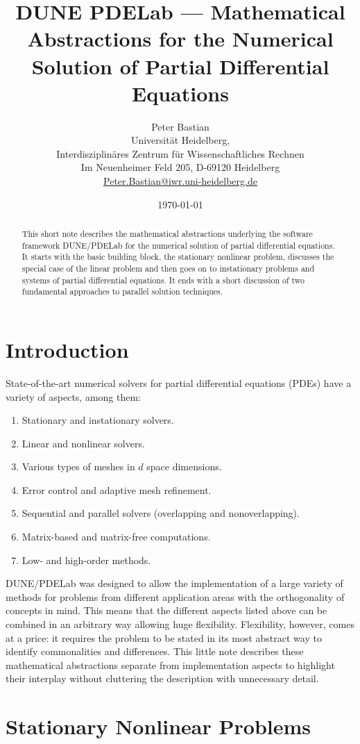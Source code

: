 \documentclass[a4paper,12pt]{article}
\title{DUNE PDELab ---
Mathematical Abstractions for the Numerical Solution of Partial Differential Equations}
\author{Peter Bastian\\
  Universität Heidelberg, \\
  Interdisziplinäres Zentrum für Wissenschaftliches Rechnen\\
  Im Neuenheimer Feld 205, D-69120 Heidelberg\\
  \url{Peter.Bastian@iwr.uni-heidelberg.de}
}
\date{\today}
\theoremstyle{definition}
\begin{document}
\maketitle

\begin{abstract}
This short note describes the mathematical abstractions underlying the
software framework DUNE/PDELab for the numerical solution of partial
differential equations. It starts with the basic building block, the
stationary nonlinear problem, discusses the special case of the linear
problem and then goes on to instationary problems and systems of partial
differential equations. It ends with a short discussion of two fundamental
approaches to parallel solution techniques.
\end{abstract}

\section{Introduction}

State-of-the-art numerical solvers for partial differential equations (PDEs)
have a variety of aspects, among them:
\begin{enumerate}[1)]
\item Stationary and instationary solvers.
\item Linear and nonlinear solvers.
\item Various types of meshes in $d$ space dimensions.
\item Error control and adaptive mesh refinement.
\item Sequential and parallel solvers (overlapping and nonoverlapping).
\item Matrix-based and matrix-free computations.
\item Low- and high-order methods.
\end{enumerate}
DUNE/PDELab was designed to allow the implementation of a large variety
of methods for problems from different application areas with the orthogonality
of concepts in mind. This means that the different aspects listed above
can be combined in an arbitrary way allowing huge flexibility.
Flexibility, however, comes at a price: it requires the problem to
be stated in its most abstract way to identify commonalities and differences.
This little note describes
these mathematical abstractions separate from implementation
aspects to highlight their interplay without cluttering the description
with unnecessary detail.

\section{Stationary Nonlinear Problems}\label{Sec:BasicBuildingBlock}
\end{document}

